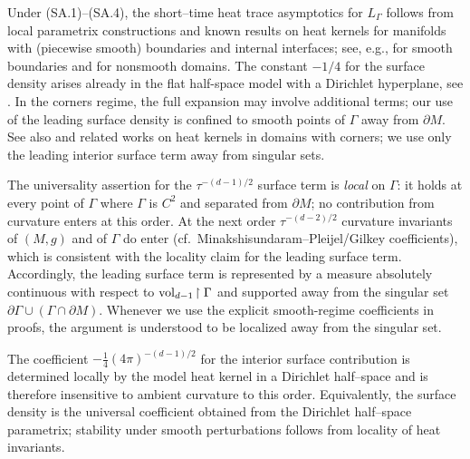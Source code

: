 \begin{remark}\label{rem:existence-heat}
Under (SA.1)–(SA.4), the short–time heat trace asymptotics for $L_\Gamma$ follows from local parametrix constructions and known results on heat kernels for manifolds with (piecewise smooth) boundaries and internal interfaces; see, e.g., \cite{SafarovVassiliev1997,Gilkey1995} for smooth boundaries and \cite{Grisvard1985} for nonsmooth domains.
The constant $-1/4$ for the surface density arises already in the flat half-space model with a Dirichlet hyperplane, see \cite[Sec.~1.5]{Gilkey1995}.
In the corners regime, the full expansion may involve additional terms; our use of the leading surface density is confined to smooth points of $\Gamma$ away from $\partial M$.
See also \cite{Grieser2002} and related works on heat kernels in domains with corners; we use only the leading interior surface term away from singular sets.
\end{remark}

\begin{remark}\label{rem:local-universal-density}
The universality assertion for the $\tau^{-(d-1)/2}$ surface term is \emph{local} on $\Gamma$:
it holds at every point of $\Gamma$ where $\Gamma$ is $C^2$ and separated from $\partial M$; no contribution from curvature enters at this order.
At the next order $\tau^{-(d-2)/2}$ curvature invariants of $(M,g)$ and of $\Gamma$ do enter (cf.\ Minakshisundaram–Pleijel/Gilkey coefficients), which is consistent with the locality claim for the leading surface term.
Accordingly, the leading surface term is represented by a measure absolutely continuous with respect to $\operatorname{vol}_{d-1}\!\upharpoonright\Gamma$ and supported away from the singular set $\partial\Gamma\cup(\Gamma\cap\partial M)$.
Whenever we use the explicit smooth-regime coefficients in proofs, the argument is understood to be localized away from the singular set.
\end{remark}

\begin{remark}\label{rem:robust-coeff}
The coefficient $-\tfrac14(4\pi)^{-(d-1)/2}$ for the interior surface contribution is determined locally by the model heat kernel in a Dirichlet half–space and is therefore insensitive to ambient curvature to this order.
Equivalently, the surface density is the universal coefficient obtained from the Dirichlet half–space parametrix; stability under smooth perturbations follows from locality of heat invariants.
\end{remark}

